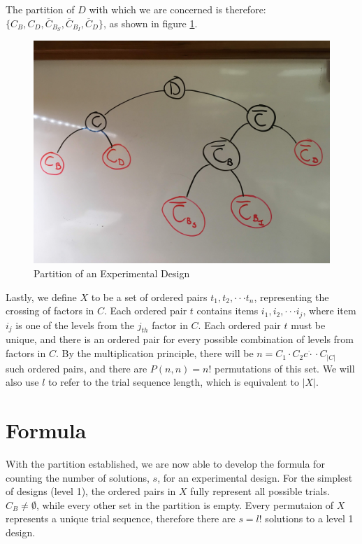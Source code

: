 The partition of $D$ with which we are concerned is therefore: $\{C_B, C_D, \overline{C}_{B_S}, \overline{C}_{B_I}, \overline{C}_D\}$, as shown in figure \ref{fig:partition}.

\begin{figure}
\centering
\centerline{\includegraphics[origin=c,width=12cm]{../figures/partition.jpg}}
\caption{Partition of an Experimental Design}
\label{fig:partition}
\end{figure}

Lastly, we define $X$ to be a set of ordered pairs $t_1, t_2, \cdot\cdot\cdot t_n$, representing the crossing of factors in $C$. Each ordered pair $t$ contains items $i_1, i_2, \cdot\cdot\cdot i_j$, where item $i_j$ is one of the levels from the $j_{th}$ factor in $C$. Each ordered pair $t$ must be unique, and there is an ordered pair for every possible combination of levels from factors in $C$. By the multiplication principle, there will be $n = C_1 \cdot C_2 c\dot\cdot\cdot C_{|C|}$ such ordered pairs, and there are $P(n, n) = n!$ permutations of this set. We will also use $l$ to refer to the trial sequence length, which is equivalent to $|X|$.


\section{Formula}

With the partition established, we are now able to develop the formula for counting the number of solutions, $s$, for an experimental design. For the simplest of designs (level 1), the ordered pairs in $X$ fully represent all possible trials. $C_B \neq \emptyset$, while every other set in the partition is empty. Every permutaion of $X$ represents a unique trial sequence, therefore there are $s = l!$ solutions to a level 1 design.

